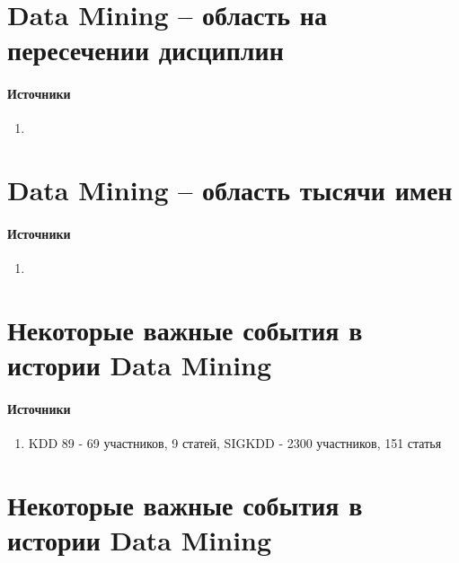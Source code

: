 \documentclass[10pt,a4paper]{article}
\begin{document}

\section{Data Mining -- область на пересечении дисциплин}

\paragraph{Источники} \cite{journeys}

\begin{enumerate}
\item 
\end{enumerate}


\section{Data Mining -- область тысячи имен}

\paragraph{Источники} \cite{journeys}

\begin{enumerate}
\item 
\end{enumerate}


\section{Некоторые важные события в истории Data Mining}

\paragraph{Источники} \cite{journeys}

\begin{enumerate}
\item KDD 89 - 69 участников, 9 статей, SIGKDD - 2300 участников, 151 статья
\end{enumerate}


\section{Некоторые важные события в истории Data Mining}
\end{document}
